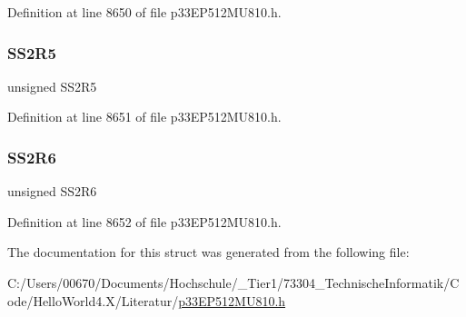 Definition at line 8650 of file p33\+E\+P512\+M\+U810.\+h.

\mbox{\label{structtag_r_p_i_n_r23_b_i_t_s_a336267ad9233ae6657a70797f569b47e}} 
\subsubsection{\texorpdfstring{S\+S2\+R5}{SS2R5}}
{\footnotesize\ttfamily unsigned S\+S2\+R5}



Definition at line 8651 of file p33\+E\+P512\+M\+U810.\+h.

\mbox{\label{structtag_r_p_i_n_r23_b_i_t_s_a0a6df35bc166904f6a4a6bafa5f99edd}} 
\subsubsection{\texorpdfstring{S\+S2\+R6}{SS2R6}}
{\footnotesize\ttfamily unsigned S\+S2\+R6}



Definition at line 8652 of file p33\+E\+P512\+M\+U810.\+h.



The documentation for this struct was generated from the following file\+:\begin{DoxyCompactItemize}
\item 
C\+:/\+Users/00670/\+Documents/\+Hochschule/\+\_\+\+Tier1/73304\+\_\+\+Technische\+Informatik/\+Code/\+Hello\+World4.\+X/\+Literatur/\hyperlink{p33_e_p512_m_u810_8h}{p33\+E\+P512\+M\+U810.\+h}\end{DoxyCompactItemize}
